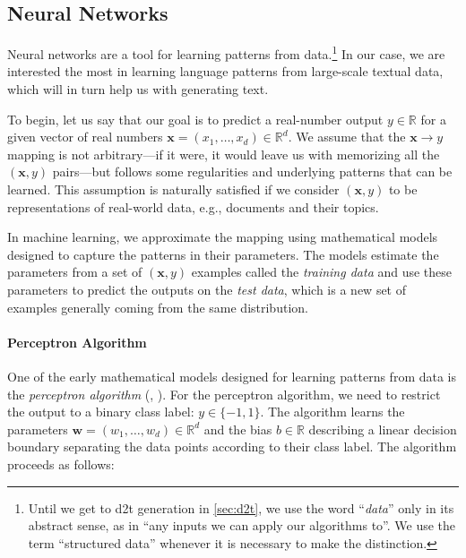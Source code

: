 \subsection{Neural Networks}
\label{sec:nns}
Neural networks are a tool for learning patterns from data.\footnote{Until we get to \ac{d2t} generation in \autoref{sec:d2t}, we use the word ``\textit{data}'' only in its abstract sense, as in ``any inputs we can apply our algorithms to''. We use the term ``structured data'' whenever it is necessary to make the distinction.} In our case, we are interested the most in learning language patterns from large-scale textual data, which will in turn help us with generating text.

To begin, let us say that our goal is to predict a real-number output $y \in \mathbb{R}$ for a given vector of real numbers $\mathbf{x} = (x_1, \ldots, x_d) \in \mathbb{R}^d$.
We assume that the $\mathbf{x} \rightarrow y$ mapping is not arbitrary---if it were, it would leave us with memorizing all the $(\mathbf{x},y)$ pairs---but follows some regularities and underlying patterns that can be learned. This assumption is naturally satisfied if we consider $(\mathbf{x},y)$ to be representations of real-world data, e.g., documents and their topics.

In machine learning, we approximate the mapping using mathematical models designed to capture the patterns in their parameters. The models estimate the parameters from a set of $(\mathbf{x},y)$ examples called the \textit{training data} and use these parameters to predict the outputs on the \textit{test data}, which is a new set of examples generally coming from the same distribution.

\paragraph{Perceptron Algorithm} One of the early mathematical models designed for learning patterns from data is the \emph{perceptron algorithm} (\citealp{rosenblatt1958perceptron}, \citealp[p.~192]{bishop2006pattern}). For the perceptron algorithm, we need to restrict the output to a binary class label: $y \in \{-1, 1\}$. The algorithm learns the parameters $\textbf{w} = (w_1, \ldots, w_d) \in \mathbb{R}^d$ and the bias $b \in \mathbb{R}$ describing a linear decision boundary separating the data points according to their class label. The algorithm proceeds as follows:


